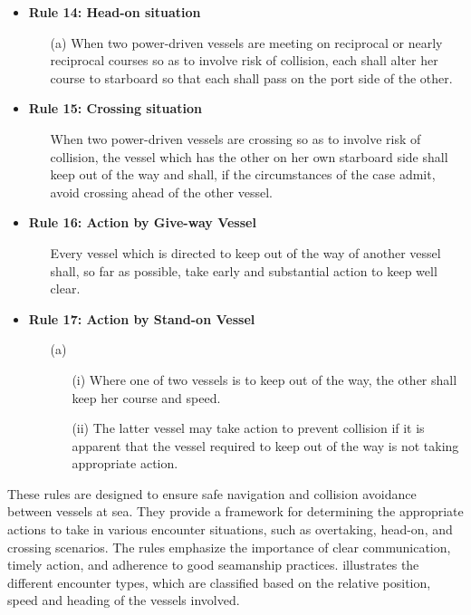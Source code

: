 \begin{itemize}
\begin{enumerate}
        \end{enumerate}
    \item \textbf{Rule 14: Head-on situation}
        \begin{enumerate}
            \item[(a)] When two power-driven vessels are meeting on reciprocal or nearly reciprocal courses so as to involve risk of collision, each shall alter her course to starboard so that each shall pass on the port side of the other.
        \end{enumerate}
    \item \textbf{Rule 15: Crossing situation}
    \begin{enumerate}
        \item[] When two power-driven vessels are crossing so as to involve risk of collision, the vessel which has the other on her own starboard side shall keep out of the way and shall, if the circumstances of the case admit, avoid crossing ahead of the other vessel.
    
    \end{enumerate}
    \item \textbf{Rule 16: Action by Give-way Vessel}
    \begin{enumerate}
        \item [] Every vessel which is directed to keep out of the way of another vessel shall, so far as possible, take early and substantial action to keep well clear.
    \end{enumerate}
    \item \textbf{Rule 17: Action by Stand-on Vessel}
    \begin{enumerate}
        \item[(a)]
        \begin{enumerate}
            \item[(i)] Where one of two vessels is to keep out of the way, the other shall keep her course and speed.
            \item[(ii)] The latter vessel may take action to prevent collision if it is apparent that the vessel required to keep out of the way is not taking appropriate action.
        \end{enumerate}
    \end{enumerate}
\end{itemize}


These rules are designed to ensure safe navigation and collision avoidance between vessels at sea. They provide a framework for determining the appropriate actions to take in various encounter situations, such as overtaking, head-on, and crossing scenarios. The rules emphasize the importance of clear communication, timely action, and adherence to good seamanship practices.  illustrates the different encounter types, which are classified based on the relative position, speed and heading of the vessels involved. 

